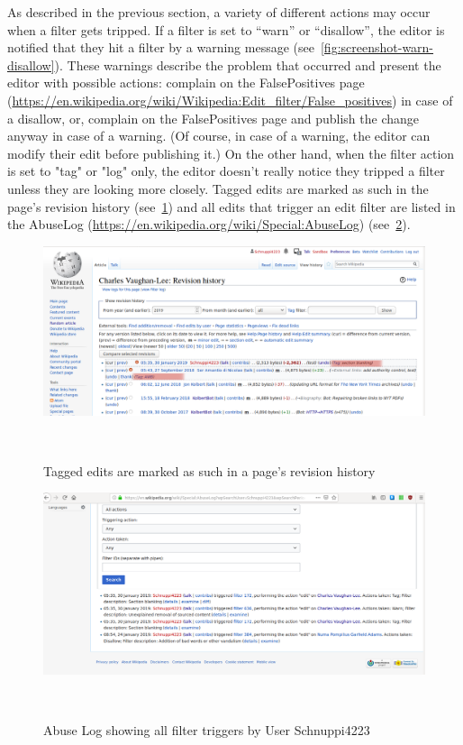 As described in the previous section, a variety of different actions may occur when a filter gets tripped.
If a filter is set to ``warn'' or ``disallow'', the editor is notified that they hit a filter by a warning message (see~\ref{fig:screenshot-warn-disallow}).
These warnings describe the problem that occurred and present the editor with possible actions:
complain on the FalsePositives page (\url{https://en.wikipedia.org/wiki/Wikipedia:Edit_filter/False_positives}) in case of a disallow,
or, complain on the FalsePositives page and publish the change anyway in case of a warning.
(Of course, in case of a warning, the editor can modify their edit before publishing it.)
On the other hand, when the filter action is set to "tag" or "log" only, the editor doesn't really notice they tripped a filter unless they are looking more closely.
Tagged edits are marked as such in the page's revision history (see~\ref{fig:tags-in-history})
and all edits that trigger an edit filter are listed in the AbuseLog (\url{https://en.wikipedia.org/wiki/Special:AbuseLog}) (see~\ref{fig:screenshot-abuse-log}).

\begin{figure}
\centering
  \includegraphics[width=0.9\columnwidth]{pics/screenshots-filter-trigger/Screenshot-tags-in-revision-history.png}
  \caption{Tagged edits are marked as such in a page's revision history}~\label{fig:tags-in-history}
\end{figure}

\begin{figure}
\centering
  \includegraphics[width=0.9\columnwidth]{pics/screenshots-filter-trigger/Screenshot-abuse-log.png}
  \caption{Abuse Log showing all filter triggers by User Schnuppi4223}~\label{fig:screenshot-abuse-log}
\end{figure}

